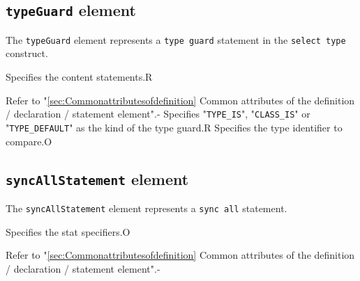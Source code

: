 \subsection{ {\tt typeGuard} element}

The {\tt typeGuard} element represents a {\tt type guard} statement in the {\tt select type} construct.


\begin{XcodeMLChildElements}
{Specifies the content statements.}{R}
\end{XcodeMLChildElements}

\begin{XcodeMLAttributes}
{Refer to "\ref{sec:Commonattributesofdefinition} Common attributes of the definition / declaration / statement element".}{-}
{Specifies "{\tt TYPE\_IS}", "{\tt CLASS\_IS}" or "{\tt TYPE\_DEFAULT}" as the kind of the type guard.}{R}
{Specifies the type identifier to compare.}{O}
\end{XcodeMLAttributes}


\subsection{ {\tt syncAllStatement} element}

The {\tt syncAllStatement} element represents a {\tt sync all} statement.


\begin{XcodeMLChildElements}
{Specifies the stat specifiers.}{O}
\end{XcodeMLChildElements}

\begin{XcodeMLAttributes}
{Refer to "\ref{sec:Commonattributesofdefinition} Common attributes of the definition / declaration / statement element".}{-}
\end{XcodeMLAttributes}


